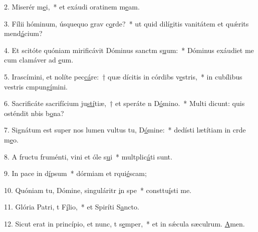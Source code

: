 2. Miserér m\uline{e}i,~* et exáudi oratinem m\uline{e}am.\par 
3. Fílii hóminum, úsquequo grav c\uline{o}rde?~* ut quid dilígitis vanitátem et quǽrits mend\uline{á}cium?\par 
4. Et scitóte quóniam mirificávit Dóminus sanctm s\uline{u}um:~* Dóminus exáudiet me cum clamáver ad \uline{e}um.\par 
5. Irascímini, et nolíte pec\uline{cá}re:~† quæ dícitis in córdibs v\uline{e}stris,~* in cubílibus vestris cmpung\uline{í}mini.\par 
6. Sacrificáte sacrifícium ju\uline{stí}tiæ,~† et speráte n D\uline{ó}mino.~* Multi dicunt: quis osténdit nbis b\uline{o}na?\par 
7. Signátum est super nos lumen vultus tu, D\uline{ó}mine:~* dedísti lætítiam in crde m\uline{e}o.\par 
8. A fructu fruménti, vini et óle s\uline{u}i~* multplic\uline{á}ti sunt.\par 
9. In pace in d\uline{í}psum~* dórmiam et rqui\uline{é}scam;\par 
10. Quóniam tu, Dómine, singuláritr \uline{i}n spe~* consttu\uline{í}sti me.\par 
11. Glória Patri, t F\uline{í}lio,~* et Spiríti S\uline{a}ncto.\par 
12. Sicut erat in princípio, et nunc, t s\uline{e}mper,~* et in sǽcula sæculrum. \uline{A}men.\par 
